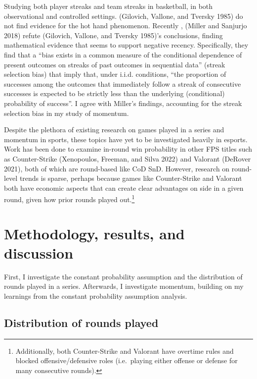 \documentclass{article}
\begin{document}
Studying both player streaks and team streaks in basketball, in both
observational and controlled settings. (Gilovich, Vallone, and Tversky
1985) do not find evidence for the hot hand phenomenon. Recently ,
(Miller and Sanjurjo 2018) refute (Gilovich, Vallone, and Tversky
1985)'s conclusions, finding mathematical evidence that seems to support
negative recency. Specifically, they find that a ``bias exists in a
common measure of the conditional dependence of present outcomes on
streaks of past outcomes in sequential data'' (streak selection bias)
that imply that, under i.i.d. conditions, ``the proportion of successes
among the outcomes that immediately follow a streak of consecutive
successes is expected to be strictly less than the underlying
(conditional) probability of success''. I agree with Miller's findings,
accounting for the streak selection bias in my study of momentum.

Despite the plethora of existing research on games played in a series
and momentum in sports, these topics have yet to be investigated heavily
in esports. Work has been done to examine in-round win probability in
other FPS titles such as Counter-Strike (Xenopoulos, Freeman, and Silva
2022) and Valorant (DeRover 2021), both of which are round-based like
CoD SnD. However, research on round-level trends is sparse, perhaps
because games like Counter-Strike and Valorant both have economic
aspects that can create clear advantages on side in a given round, given
how prior rounds played out.\footnote{Additionally, both Counter-Strike
  and Valorant have overtime rules and blocked offensive/defensive roles
  (i.e.~playing either offense or defense for many consecutive rounds).}

\hypertarget{methodology-results-and-discussion}{%
\section{Methodology, results, and
discussion}\label{methodology-results-and-discussion}}

First, I investigate the constant probability assumption and the
distribution of rounds played in a series. Afterwards, I investigate
momentum, building on my learnings from the constant probability
assumption analysis.

\hypertarget{distribution-of-rounds-played}{%
\subsection{Distribution of rounds
played}\label{distribution-of-rounds-played}}
\end{document}
